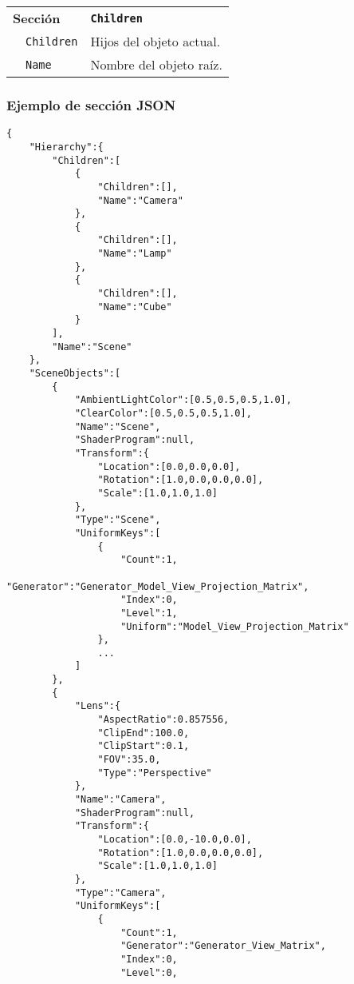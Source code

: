 \begin{center}
\small
\begin{longtable}{|l|l|p{7.5cm}|}
  \cline{1-3}
  \multicolumn{2}{|l}{\bf Sección} & {\bf \tt Children} \\
  \cline{2-3}
  & {\tt Children} & Hijos del objeto actual.\\
  \cline{2-3}
  & {\tt Name} & Nombre del objeto raíz.\\  
  \cline{1-3}
\end{longtable}
\end{center}

\subsubsection{Ejemplo de sección JSON}
\begin{verbatim}
{
    "Hierarchy":{
        "Children":[
            {
                "Children":[],
                "Name":"Camera"
            },
            {
                "Children":[],
                "Name":"Lamp"
            },
            {
                "Children":[],
                "Name":"Cube"
            }
        ],
        "Name":"Scene"
    },
    "SceneObjects":[
        {
            "AmbientLightColor":[0.5,0.5,0.5,1.0],
            "ClearColor":[0.5,0.5,0.5,1.0],
            "Name":"Scene",
            "ShaderProgram":null,
            "Transform":{
                "Location":[0.0,0.0,0.0],
                "Rotation":[1.0,0.0,0.0,0.0],
                "Scale":[1.0,1.0,1.0]
            },
            "Type":"Scene",
            "UniformKeys":[
                {
                    "Count":1,
                    "Generator":"Generator_Model_View_Projection_Matrix",
                    "Index":0,
                    "Level":1,
                    "Uniform":"Model_View_Projection_Matrix"
                },
                ...
            ]
        },
        {
            "Lens":{
                "AspectRatio":0.857556,
                "ClipEnd":100.0,
                "ClipStart":0.1,
                "FOV":35.0,
                "Type":"Perspective"
            },
            "Name":"Camera",
            "ShaderProgram":null,
            "Transform":{
                "Location":[0.0,-10.0,0.0],
                "Rotation":[1.0,0.0,0.0,0.0],
                "Scale":[1.0,1.0,1.0]
            },
            "Type":"Camera",
            "UniformKeys":[
                {
                    "Count":1,
                    "Generator":"Generator_View_Matrix",
                    "Index":0,
                    "Level":0,

\end{verbatim}
